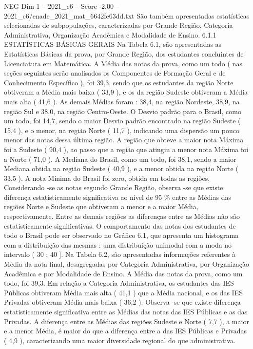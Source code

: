 \begin{textsample}{NEG Dim 1 – 2021\_c6 – Score -2.00 – 2021\_c6/enade\_2021\_mat\_6642fe63dd.txt}
São também apresentadas estatísticas selecionadas de subpopulações, caracterizadas por Grande Região, Categoria Administrativa, Organização Acadêmica e Modalidade de Ensino. 6.1.1 ESTATÍSTICAS BÁSICAS GERAIS Na Tabela 6.1, são apresentadas as Estatísticas Básicas da prova, por Grande Região, dos estudantes concluintes de Licenciatura em Matemática.
A Média das notas da prova, como um todo ( nas seções seguintes serão analisados os Componentes de Formação Geral e de Conhecimento Específico ), foi 39,3, sendo que os estudantes da região Norte obtiveram a Média mais baixa ( 33,9 ), e os da região Sudeste obtiveram a Média mais alta ( 41,6 ).
As demais Médias foram : 38,4, na região Nordeste, 38,9, na região Sul e 38,0, na região Centro-Oeste.
O Desvio padrão para o Brasil, como um todo, foi 14,7, sendo o maior Desvio padrão encontrado na região Sudeste ( 15,4 ), e o menor, na região Norte ( 11,7 ), indicando uma dispersão um pouco menor das notas dessa última região.
A região que obteve a maior nota Máxima foi a Sudeste ( 90,4 ), ao passo que a região que atingiu a menor nota Máxima foi a Norte ( 71,0 ).
A Mediana do Brasil, como um todo, foi 38,1, sendo a maior Mediana obtida na região Sudeste ( 40,9 ), e a menor obtida na região Norte ( 33,5 ).
A nota Mínima do Brasil foi zero, obtida em todas as regiões.
Considerando -se as notas segundo Grande Região, observa -se que existe diferença estatisticamente significativa ao nível de 95 \% entre as Médias das regiões Norte e Sudeste que obtiveram a menor e a maior Média, respectivamente.
Entre as demais regiões as diferenças entre as Médias não são estatisticamente significativas.
O comportamento das notas dos estudantes de todo o Brasil pode ser observado no Gráfico 6.1, que apresenta um histograma com a distribuição das mesmas : uma distribuição unimodal com a moda no intervalo ( 30 ; 40 ].
Na Tabela 6.2, são apresentadas informações referentes à Média da nota final, desagregadas por Categoria Administrativa, por Organização Acadêmica e por Modalidade de Ensino.
A Média das notas da prova, como um todo, foi 39,3.
Em relação a Categoria Administrativa, os estudantes das IES Públicas obtiveram Média mais alta ( 41,1 ) que a Média nacional, e os das IES Privadas obtiveram Média mais baixa ( 36,2 ).
Observa -se que existe diferença estatisticamente significativa entre as Médias das notas das IES Públicas e as das Privadas.
A diferença entre as Médias das regiões Sudeste e Norte ( 7,7 ), a maior e a menor Média, é maior do que a diferença entre a das IES Públicas e Privadas ( 4,9 ), caracterizando uma maior diversidade regional do que administrativa.

\end{textsample}

